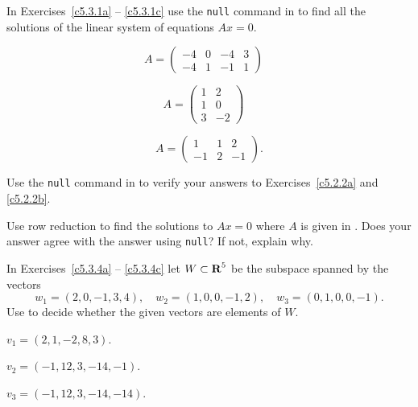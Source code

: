 \documentclass{ximera}
\begin{document}
\noindent In Exercises~\ref{c5.3.1a} -- \ref{c5.3.1c} use the {\tt null}
command in \Matlab to find all the solutions of the linear system of
equations $Ax=0$.  
\begin{exercise} \label{c5.3.1a}
\begin{equation*} \label{e:BCDa}
          A=    \left(\begin{array}{cccc}
                -4 & 0 & -4 & 3\\
                -4 & 1 & -1 & 1
                \end{array}\right) \quad
\end{equation*}
\end{exercise}
\begin{exercise} \label{c5.3.1b}
\begin{equation*} \label{e:BCDb}
           A=    \left(\begin{array}{rr}
                1 & 2 \\
                1 & 0 \\
                3 & -2
                \end{array}\right) \quad
\end{equation*}
\end{exercise}
\begin{exercise} \label{c5.3.1c}
\begin{equation*} \label{e:BCDc}
          A=      \left(\begin{array}{rrr}
               1  &  1  &  2\\
              -1  &  2  & -1
                \end{array}\right).
\end{equation*}
\end{exercise}

\begin{exercise} \label{c5.3.2}
Use the {\tt null} command in \Matlab to verify your answers to
Exercises~\ref{c5.2.2a} and \ref{c5.2.2b}.
\end{exercise}

\begin{exercise} \label{c5.3.3}
Use row reduction to find the solutions to $Ax=0$ where $A$ is
given in .  Does your answer agree with the \Matlab
answer using {\tt null}?  If not, explain why.
\end{exercise}

\noindent In Exercises~\ref{c5.3.4a} -- \ref{c5.3.4c} let $W\subset\mbox{$\bf{R}$}^5$
be the subspace spanned by the vectors
\begin{equation*}
     w_1=(2,0,-1,3,4),\quad w_2=(1,0,0,-1,2),\quad w_3=(0,1,0,0,-1).
\end{equation*}
Use \Matlab to decide whether the given vectors are elements of $W$.
\begin{exercise} \label{c5.3.4a}
$v_1=(2,1,-2,8,3)$.
\end{exercise}
\begin{exercise} \label{c5.3.4b}
$v_2=(-1,12,3,-14,-1)$.
\end{exercise}
\begin{exercise} \label{c5.3.4c}
$v_3=(-1,12,3,-14,-14)$.
\end{exercise}
\end{document}

